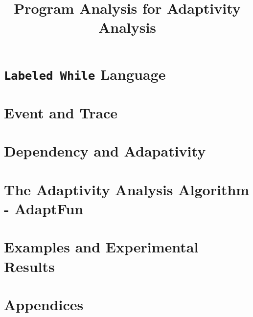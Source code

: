 \documentclass[a4paper,11pt]{article}
\newcommand{\THESYSTEM}{\textsf{AdaptFun}}
\begin{document}
\title{Program Analysis for Adaptivity Analysis}

\author{}

\date{}

\maketitle
%
\tableofcontents

% 
\section{{\tt Labeled While} Language}

\clearpage
\section{Event and Trace}


\clearpage
\section{Dependency and Adapativity}

\clearpage
\section{The Adaptivity Analysis Algorithm - \THESYSTEM}
\label{sec:adpfun}


\section{Examples and Experimental Results}


%
\clearpage
\appendix
{}
\section*{Appendices}



\end{document}

